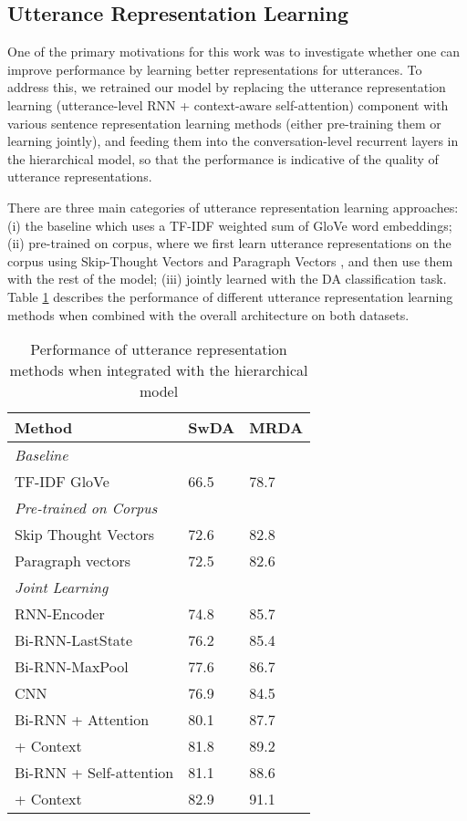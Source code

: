 \documentclass[11pt,a4paper]{article}
\begin{document}
\subsection{Utterance Representation Learning}
\label{utt-rep-learning-section}
One of the primary motivations for this work was to investigate whether one can improve performance by learning better representations for utterances. 
To address this, we retrained our model by replacing the utterance representation learning (utterance-level RNN + context-aware self-attention) component with various sentence representation learning methods (either pre-training them or learning jointly), and feeding them into the conversation-level recurrent layers in the hierarchical model, so that the performance is indicative of the quality of utterance representations. 

There are three main categories of utterance representation learning approaches: (i) the baseline which uses a TF-IDF weighted sum of GloVe word embeddings; (ii)  pre-trained on corpus, where we first learn utterance representations on the corpus using Skip-Thought Vectors \cite{kiros2015skip} and Paragraph Vectors \cite{le2014distributed}, and then use them with the rest of the model; (iii) jointly learned with the DA classification task. Table \ref{utt-rep} describes the performance of different utterance representation learning methods when combined with the overall architecture on both datasets. 

\begin{table}[t!]
\centering
\small 
\begin{tabular}{lll}
\hline \bf Method & \bf SwDA & \bf MRDA \\ \hline
\it{Baseline} \\
TF-IDF GloVe & 66.5 & 78.7 \\
\hline
\it{Pre-trained on Corpus} \\
Skip Thought Vectors & 72.6 & 82.8 \\
Paragraph vectors & 72.5 & 82.6\\
\hline 
\it{Joint Learning} \\
RNN-Encoder & 74.8	& 85.7\\
Bi-RNN-LastState & 76.2 & 85.4 \\
Bi-RNN-MaxPool & 77.6 & 86.7\\
CNN & 76.9 & 84.5 \\
Bi-RNN + Attention & 80.1	& 87.7\\
\hspace{30pt} + Context & 81.8 &	89.2 \\
Bi-RNN + Self-attention & 81.1 & 88.6 \\
\hspace{30pt} + Context & 82.9	& 91.1\\
\hline
\end{tabular}
\caption{\label{utt-rep} Performance of utterance representation methods when integrated with the hierarchical model}
\end{table}
\end{document}
